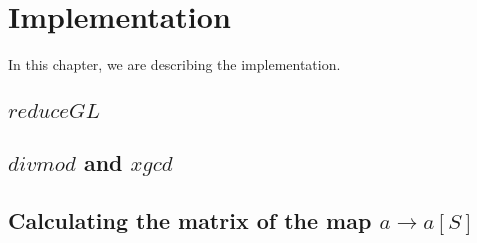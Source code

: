 
\section{Implementation}

In this chapter, we are describing the implementation.

\subsection{$reduceGL$}

\subsection{$divmod$ and $xgcd$}

\subsection{Calculating the matrix of the map $a \rightarrow a[S]$}
